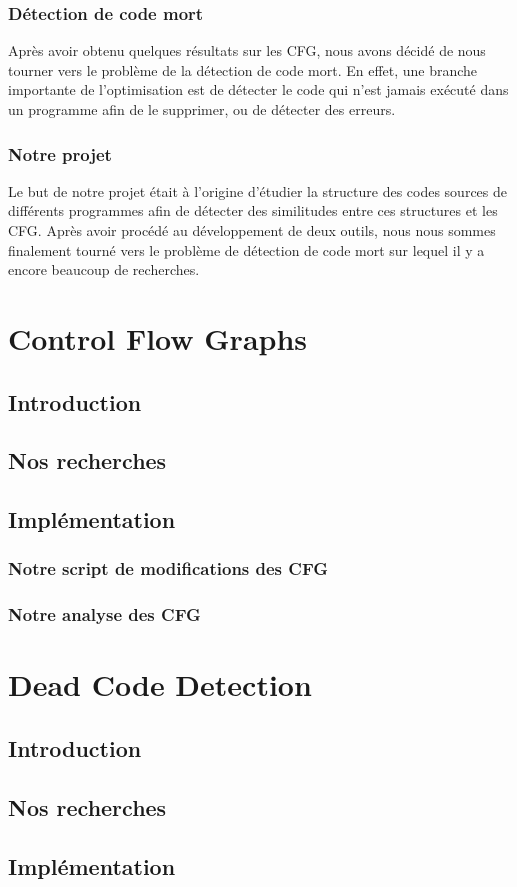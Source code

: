 \documentclass[a4paper, titlepage]{report}
\begin{document}
\subsection{Détection de code mort}
Après avoir obtenu quelques résultats sur les CFG, nous avons décidé de nous tourner vers le problème de la détection de code mort. En effet, une branche importante de l'optimisation est de détecter le code qui n'est jamais exécuté dans un programme afin de le supprimer, ou de détecter des erreurs.
\subsection{Notre projet}
Le but de notre projet était à l'origine d'étudier la structure des codes sources de différents programmes afin de détecter des similitudes entre ces structures et les CFG. Après avoir procédé au développement de deux outils, nous nous sommes finalement tourné vers le problème de détection de code mort sur lequel il y a encore beaucoup de recherches. 

\chapter{Control Flow Graphs}
\section{Introduction}
\section{Nos recherches}
\section{Implémentation}
\subsection{Notre script de modifications des CFG}
\subsection{Notre analyse des CFG}

\chapter{Dead Code Detection}
\section{Introduction}
\section{Nos recherches}
\section{Implémentation}



\end{document}
